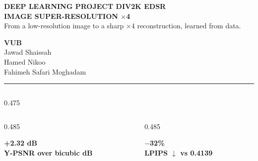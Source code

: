 \documentclass[final]{beamer}
\begin{document}
\begin{frame}[t]

\begin{tcolorbox}[colback=vubblue, colframe=vubblue, arc=0pt, boxrule=0pt,
                  left=28pt, right=28pt, top=22pt, bottom=18pt]
  \begin{minipage}[b]{0.76\linewidth}
    {\color{vubblue!30!white}\Large\bfseries DEEP LEARNING PROJECT\; \textperiodcentered\; DIV2K\; \textperiodcentered\; EDSR}\\[0.4ex]
    {\color{white}\veryHuge\bfseries IMAGE SUPER-RESOLUTION {\color{vuborange!80!white}$\times$4}}\\[0.6ex]
    {\color{vubblue!20!white}\large From a low-resolution image to a sharp $\times$4 reconstruction, learned from data.}
  \end{minipage}\hfill
  \begin{minipage}[b]{0.22\linewidth}
    \raggedleft
    {\color{white}\LARGE\bfseries VUB}\\[0.5ex]
    {\color{vubblue!20!white}\large Jawad Shaissah\\ Hamed Nikoo\\ Fahimeh Safari Moghadam}
  \end{minipage}
\end{tcolorbox}
\vspace{-1.2ex}
{\color{vuborange}\rule{\linewidth}{6pt}}

\vspace{0.8em}

\begin{columns}[t]

\begin{column}{0.475\linewidth}
  \begin{columns}[t]
    \begin{column}{0.485\linewidth}
      \begin{card}
        {\color{vubblue}\VERYHuge\bfseries +2.32 dB}\\[0.3ex]
        {\color{inkmuted}\large\bfseries Y-PSNR over bicubic\; \textperiodcentered{} dB}
      \end{card}
    \end{column}
    \begin{column}{0.485\linewidth}
      \begin{card}
        {\color{vubblue}\VERYHuge\bfseries $-$32\%}\\[0.3ex]
        {\color{inkmuted}\large\bfseries LPIPS $\downarrow$\; \textperiodcentered{} vs 0.4139}
      \end{card}
    \end{column}
  \end{columns}


\end{column}
\end{columns}
\end{frame}
\end{document}
